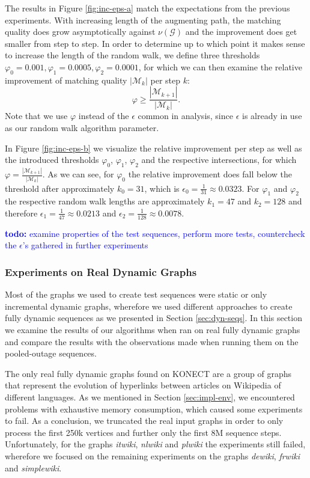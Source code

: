 \documentclass{article}      %
\newcommand\todo[1]{\textcolor{blue}{\textbf{todo: }#1}}
\begin{document}
The results in Figure \ref{fig:inc-eps-a} match the expectations from the previous experiments. With increasing length of the augmenting path, the matching quality does grow asymptotically against $\nu(\mathcal{G})$ and the improvement does get smaller from step to step. In order to determine up to which point it makes sense to increase the length of the random walk, we define three thresholds $\varphi_0 = 0.001, \varphi_1 = 0.0005, \varphi_2 = 0.0001$, for which we can then examine the relative improvement of matching quality $|\mathcal{M}_k|$ per step $k$:
$$
	\varphi \geq \frac{|\mathcal{M}_{k+1}|}{|\mathcal{M}_k|}.
$$
Note that we use $\varphi$ instead of the $\epsilon$ common in analysis, since  $\epsilon$ is already in use as our random walk algorithm parameter.

In Figure \ref{fig:inc-eps-b} we visualize the relative improvement per step as well as the introduced thresholds $\varphi_0$, $\varphi_1$, $\varphi_2$ and the respective intersections, for which $\varphi = \frac{|\mathcal{M}_{k+1}|}{|\mathcal{M}_k|}$. As we can see, for $\varphi_0$ the relative improvement does fall below the threshold after approximately $k_0=31$, which is $\epsilon_0=\frac{1}{31}\approx0.0323$. For $\varphi_1$ and $\varphi_2$ the respective random walk lengths are approximately $k_1=47$ and $k_2=128$ and therefore $\epsilon_1=\frac{1}{47}\approx0.0213$ and $\epsilon_2=\frac{1}{128}\approx0.0078$.

\todo{examine properties of the test sequences, perform more tests, countercheck the $\epsilon$'s gathered in further experiments}

\subsubsection{Experiments on Real Dynamic Graphs}
\label{sec:exp-real-dyn}

Most of the graphs we used to create test sequences were static or only incremental dynamic graphs, wherefore we used different approaches to create fully dynamic sequences as we presented in Section \ref{sec:dyn-seqs}. In this section we examine the results of our algorithms when ran on real fully dynamic graphs and compare the results with the observations made when running them on the pooled-outage sequences.

The only real fully dynamic graphs found on KONECT are a group of graphs that represent the evolution of hyperlinks between articles on Wikipedia of different languages. As we mentioned in Section \ref{sec:impl-env}, we encountered problems with exhaustive memory consumption, which caused some experiments to fail. As a conclusion, we truncated the real input graphs in order to only process the first 250k vertices and further only the first 8M sequence steps. Unfortunately, for the graphs \emph{itwiki}, \emph{nlwiki} and \emph{plwiki} the experiments still failed, wherefore we focused on the remaining experiments on the graphs \emph{dewiki}, \emph{frwiki} and \emph{simplewiki}.
\end{document}

